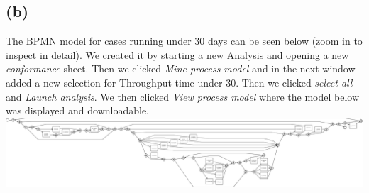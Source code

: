 \documentclass[../../main.tex]{subfiles}
\begin{document}
\subsection*{(b)}
The BPMN model for cases running under 30 days can be seen below (zoom in to inspect in detail). We created it by starting a new Analysis and opening a new \textit{conformance} sheet. Then we clicked \textit{Mine process model} and in the next window added a new selection for Throughput time under 30. Then we clicked \textit{select all} and \textit{Launch analysis}. We then clicked \textit{View process model} where the model below was displayed and downloadable.\\
\includegraphics[width=\textwidth]{img/QUESTION_5b_BPMN_model.pdf}
\end{document}
